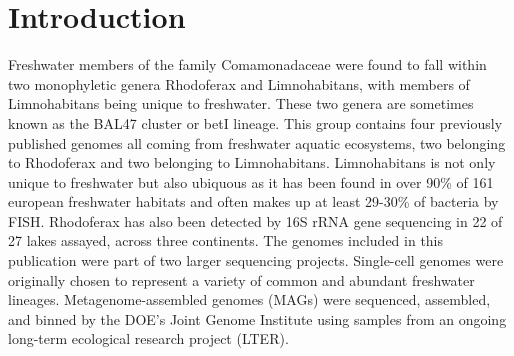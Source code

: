 \documentclass{bmcart}
\begin{document}


\section*{Introduction}
Freshwater members of the family Comamonadaceae were found to fall within two monophyletic genera Rhodoferax and Limnohabitans, with members of Limnohabitans being unique to freshwater.\cite{Newton2011b}  These two genera are sometimes known as the BAL47 cluster or betI lineage.\cite{Newton2011b}  This group contains four previously published genomes all coming from freshwater aquatic ecosystems, two belonging to Rhodoferax and two belonging to Limnohabitans.  Limnohabitans is not only unique to freshwater but also ubiquous as it has been found in over 90\% of 161 european freshwater habitats and often makes up at least 29-30\% of bacteria by FISH.\cite{Jezbera2013,Simek2010a,Kasalicky2013}  Rhodoferax has also been detected by 16S rRNA gene sequencing in 22 of 27 lakes assayed, across three continents.\cite{Zwart2002,Lindstrom2005a}
The genomes included in this publication were part of two larger sequencing projects.  Single-cell genomes were originally chosen to represent a variety of common and abundant freshwater lineages.  Metagenome-assembled genomes (MAGs) were sequenced, assembled, and binned by the DOE's Joint Genome Institute using samples from an ongoing long-term ecological research project (LTER).
\end{document}

